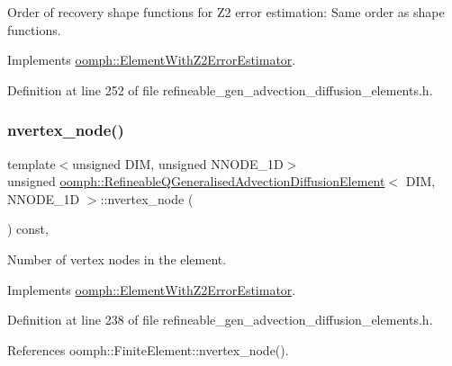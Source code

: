 Order of recovery shape functions for Z2 error estimation\+: Same order as shape functions. 



Implements \hyperlink{classoomph_1_1ElementWithZ2ErrorEstimator_af39480835bd3e0f6b2f4f7a9a4044798}{oomph\+::\+Element\+With\+Z2\+Error\+Estimator}.



Definition at line 252 of file refineable\+\_\+gen\+\_\+advection\+\_\+diffusion\+\_\+elements.\+h.

\mbox{\label{classoomph_1_1RefineableQGeneralisedAdvectionDiffusionElement_a7bbed92069c97890985f84fd996f32a4}} 
\subsubsection{\texorpdfstring{nvertex\+\_\+node()}{nvertex\_node()}}
{\footnotesize\ttfamily template$<$unsigned D\+IM, unsigned N\+N\+O\+D\+E\+\_\+1D$>$ \\
unsigned \hyperlink{classoomph_1_1RefineableQGeneralisedAdvectionDiffusionElement}{oomph\+::\+Refineable\+Q\+Generalised\+Advection\+Diffusion\+Element}$<$ D\+IM, N\+N\+O\+D\+E\+\_\+1D $>$\+::nvertex\+\_\+node (\begin{DoxyParamCaption}{ }\end{DoxyParamCaption}) const\hspace{0.3cm}{\ttfamily [inline]}, {\ttfamily [virtual]}}



Number of vertex nodes in the element. 



Implements \hyperlink{classoomph_1_1ElementWithZ2ErrorEstimator_a19495a0e77ef4ff35f15fdf7913b4077}{oomph\+::\+Element\+With\+Z2\+Error\+Estimator}.



Definition at line 238 of file refineable\+\_\+gen\+\_\+advection\+\_\+diffusion\+\_\+elements.\+h.



References oomph\+::\+Finite\+Element\+::nvertex\+\_\+node().

